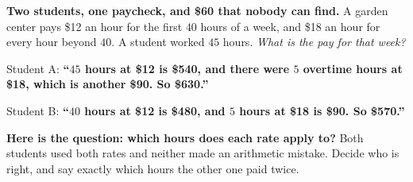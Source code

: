 \documentclass[10pt]{article}
\begin{document}
\vspace{0.10in}

\boxguard[12]
\begin{hookbox}
\small
\textbf{Two students, one paycheck, and \$60 that nobody can find.} A garden center pays \$12 an hour
for the first $40$ hours of a week, and \$18 an hour for every hour beyond $40$. A student worked
$45$ hours. \emph{What is the pay for that week?}

\smallskip
Student A: \textbf{``$45$ hours at \$12 is \$540, and there were $5$ overtime hours at \$18, which is
another \$90. So \$630.''}

\smallskip
Student B: \textbf{``$40$ hours at \$12 is \$480, and $5$ hours at \$18 is \$90. So \$570.''}

\smallskip
\textbf{Here is the question: which hours does each rate apply to?} Both students used both rates and
neither made an arithmetic mistake. Decide who is right, and say exactly which hours the other one
paid twice.

\\
\\
\end{hookbox}

\vspace{0.10in}
\end{document}
